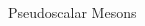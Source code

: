 \begin{frame}{Pseudoscalar Mesons}
\begin{columns}[T]
\begin{column}{0.4\textwidth}
        \end{column}
    \end{columns}
    
\end{frame}

